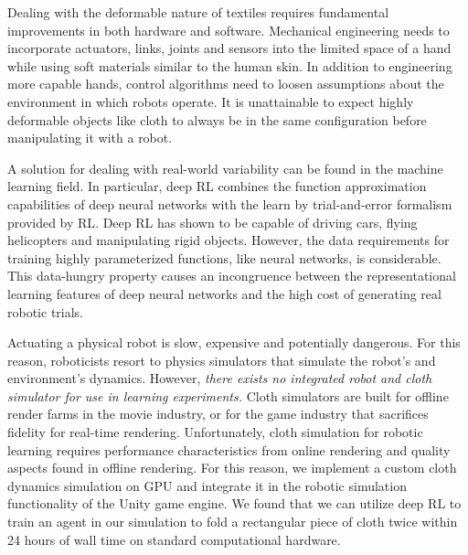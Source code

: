 \documentclass[\home/main.tex]{subfiles}
\begin{document}
Dealing with the deformable nature of textiles requires fundamental improvements in both hardware and software. Mechanical engineering needs to incorporate actuators, links, joints and sensors into the limited space of a hand while using soft materials similar to the human skin. In addition to engineering more capable hands, control algorithms need to loosen assumptions about the environment in which robots operate. It is unattainable to expect highly deformable objects like cloth to always be in the same configuration before manipulating it with a robot.

A solution for dealing with real-world variability can be found in the machine learning field. In particular, deep \gls{RL} combines the function approximation capabilities of deep neural networks with the learn by trial-and-error formalism provided by \gls{RL}. Deep \gls{RL} has shown to be capable of driving cars, flying helicopters and manipulating rigid objects. However, the data requirements for training highly parameterized functions, like neural networks, is considerable. This data-hungry property causes an incongruence between the representational learning features of deep neural networks and the high cost of generating real robotic trials.



Actuating a physical robot is slow, expensive and potentially dangerous. For this reason, roboticists resort to physics simulators that simulate the robot's and environment's dynamics. However, \emph{there exists no integrated robot and cloth simulator for use in learning experiments.}
Cloth simulators are built for offline render farms in the movie industry, or for the game industry that sacrifices fidelity for real-time rendering. Unfortunately, cloth simulation for robotic learning requires performance characteristics from online rendering and quality aspects found in offline rendering. For this reason, we implement a custom cloth dynamics simulation on GPU and integrate it in the robotic simulation functionality of the Unity game engine.
We found that we can utilize deep \gls{RL} to train an agent in our simulation to fold a rectangular piece of cloth twice within \qty{24}{} hours of wall time on standard computational hardware. 
\end{document}
